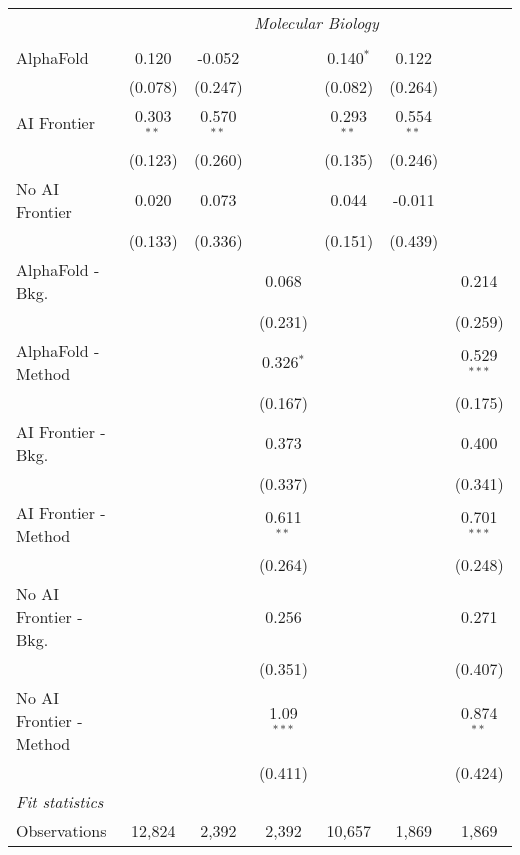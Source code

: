 \begin{tabular}{lcccccc}
 & \multicolumn{6}{c}{\textit{Molecular Biology}} \\ \\
   AlphaFold               & 0.120        & -0.052       &              & 0.140$^{*}$  & 0.122        &   \\   
                           & (0.078)      & (0.247)      &              & (0.082)      & (0.264)      &   \\   
   AI Frontier             & 0.303$^{**}$ & 0.570$^{**}$ &              & 0.293$^{**}$ & 0.554$^{**}$ &   \\   
                           & (0.123)      & (0.260)      &              & (0.135)      & (0.246)      &   \\   
   No AI Frontier          & 0.020        & 0.073        &              & 0.044        & -0.011       &   \\   
                           & (0.133)      & (0.336)      &              & (0.151)      & (0.439)      &   \\   
   AlphaFold - Bkg.        &              &              & 0.068        &              &              & 0.214\\   
                           &              &              & (0.231)      &              &              & (0.259)\\   
   AlphaFold - Method      &              &              & 0.326$^{*}$  &              &              & 0.529$^{***}$\\   
                           &              &              & (0.167)      &              &              & (0.175)\\   
   AI Frontier - Bkg.      &              &              & 0.373        &              &              & 0.400\\   
                           &              &              & (0.337)      &              &              & (0.341)\\   
   AI Frontier - Method    &              &              & 0.611$^{**}$ &              &              & 0.701$^{***}$\\   
                           &              &              & (0.264)      &              &              & (0.248)\\   
   No AI Frontier - Bkg.   &              &              & 0.256        &              &              & 0.271\\   
                           &              &              & (0.351)      &              &              & (0.407)\\   
   No AI Frontier - Method &              &              & 1.09$^{***}$ &              &              & 0.874$^{**}$\\   
                           &              &              & (0.411)      &              &              & (0.424)\\   
   \midrule
   \emph{Fit statistics}\\
   Observations            & 12,824       & 2,392        & 2,392        & 10,657       & 1,869        & 1,869\\  
   

\end{tabular}
